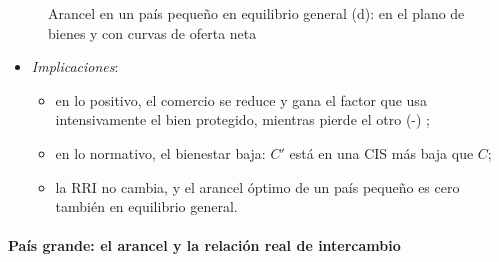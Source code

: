 \documentclass[11pt]{article}
\begin{document}
\begin{figure}[H]
\centering
\caption{Arancel en un país pequeño en equilibrio general (d): en el plano de bienes y con curvas de oferta neta}\label{fig:pequeno-general}
\end{figure}
\begin{itemize}
\item \emph{Implicaciones}:
  \begin{itemize}
  \item en lo positivo, el comercio se reduce y gana el factor que usa intensivamente el bien protegido, mientras pierde el otro (-) ;
  \item en lo normativo, el bienestar baja: $C'$ está en una CIS más baja que $C$;
  \item la RRI no cambia, y el arancel óptimo de un país pequeño es cero también en equilibrio general.
  \end{itemize}
\end{itemize}

\paragraph{País grande: el arancel y la relación real de intercambio}
\end{document}
